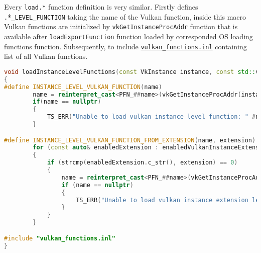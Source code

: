 Every \texttt{load.*} function definition is very similar. Firstly defines \texttt{\^.*\_LEVEL\_FUNCTION} taking the name of the Vulkan function, inside this macro Vulkan functions are initialized by \texttt{vkGetInstanceProcAddr} function that is available after \texttt{loadExportFunction} function loaded by corresponded OS loading functions function. Subsequently, to include \hyperref[lst:vk_functions_inl]{\texttt{vulkan\_functions.inl}} containing list of all Vulkan functions.
\begin{lstlisting}[language=c++, caption=Loading Vulkan functions (./engine/src/vulkan\_tools/vulkan\_loader.cpp)]
void loadInstanceLevelFunctions(const VkInstance instance, const std::vector<std::string>& enabledVulkanInstanceExtensions)
{
#define INSTANCE_LEVEL_VULKAN_FUNCTION(name)                                                 \
        name = reinterpret_cast<PFN_##name>(vkGetInstanceProcAddr(instance, #name));         \
        if(name == nullptr)                                                                  \
        {                                                                                    \
            TS_ERR("Unable to load vulkan instance level function: " #name);                 \
        }

#define INSTANCE_LEVEL_VULKAN_FUNCTION_FROM_EXTENSION(name, extension)                       \
        for (const auto& enabledExtension : enabledVulkanInstanceExtensions)                 \
        {                                                                                    \
            if (strcmp(enabledExtension.c_str(), extension) == 0)                            \
            {                                                                                \
                name = reinterpret_cast<PFN_##name>(vkGetInstanceProcAddr(instance, #name)); \
                if (name == nullptr)                                                         \
                {                                                                            \
                    TS_ERR("Unable to load vulkan instance extension level function: " #extension); \
                }                                                                            \
            }                                                                                \
        }

#include "vulkan_functions.inl"
}
\end{lstlisting}

